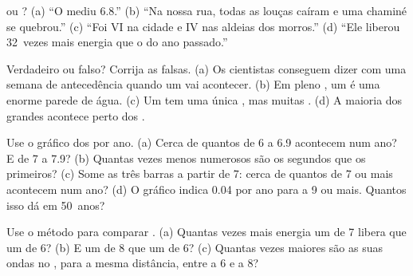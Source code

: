 \begin{exercise}[$\star$]\label{exo:g7:earthquakes:3}
 ou ? (a) ``O  mediu 6.8.'' (b) ``Na nossa
rua, todas as louças caíram e uma chaminé se quebrou.'' (c) ``Foi VI na
cidade e IV nas aldeias dos morros.'' (d) ``Ele liberou 32~vezes mais
energia que o do ano passado.''
\end{exercise}

\begin{exercise}[$\star$]\label{exo:g7:earthquakes:4}
Verdadeiro ou falso? Corrija as falsas. (a) Os cientistas conseguem dizer
com uma semana de antecedência quando um  vai acontecer. (b) Em
pleno , um  é uma enorme parede de água. (c) Um 
tem uma única , mas muitas . (d) A maioria dos
grandes  acontece perto dos .
\end{exercise}

\begin{exercise}[$\star\star$]\label{exo:g7:earthquakes:5}
Use o gráfico dos  por ano. (a) Cerca de quantos  de
 6 a 6.9 acontecem num ano? E de  7 a 7.9? (b) Quantas
vezes menos numerosos são os segundos que os primeiros? (c) Some as três
barras a partir de 7: cerca de quantos  de  7 ou mais
acontecem num ano? (d) O gráfico indica 0.04 por ano para a  9
ou mais. Quantos isso dá em 50~anos?
\end{exercise}

\begin{exercise}[$\star\star$]\label{exo:g7:earthquakes:6}
Use o método para comparar . (a) Quantas vezes mais energia um
 de  7 libera que um de  6? (b) E um de
 8 que um de  6? (c) Quantas vezes maiores são as suas
ondas no , para a mesma distância, entre a  6 e a 8?
\end{exercise}


